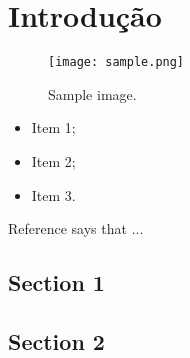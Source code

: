 \chapter{Introdução}
\label{cha:introducao}

	\lipsum
	
	\begin{figure}[htb]
		\centering
		\texttt{[image: sample.png]}
		\caption{Sample image.}
		\label{fig:sample-1}
	\end{figure}
	
	
	
	\begin{itemize}
		
		\item Item 1;
		
		\item Item 2;
		
		\item Item 3.
		
		
	\end{itemize}
	
	Reference  says that ... 

\section{Section 1}

	\lipsum
	\cite{jensen1997petrinet} 
	
\section{Section 2}

	\lipsum
	
